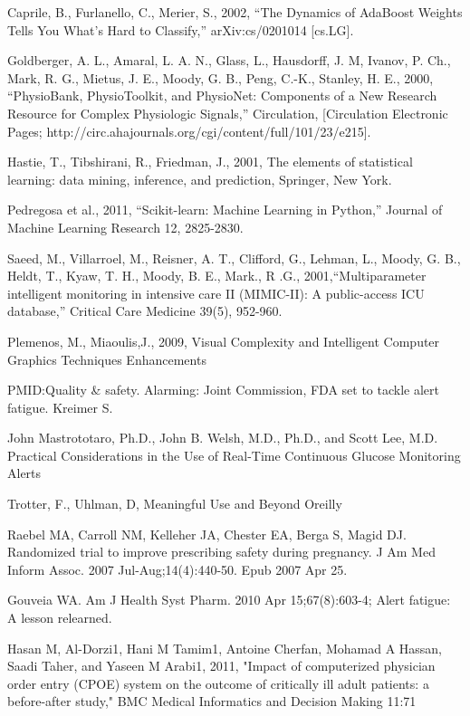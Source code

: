 \documentclass[12pt]{article}
\begin{document}
\begin{thebibliography}{1}

Caprile, B., Furlanello, C., Merier, S., 2002, ``The Dynamics of AdaBoost Weights Tells You What's Hard to Classify,'' arXiv:cs/0201014 [cs.LG].

Goldberger, A. L., Amaral, L. A. N., Glass, L., Hausdorff, J. M, Ivanov, P. Ch., Mark, R. G., Mietus, J. E., Moody, G. B., Peng, C.-K., Stanley, H. E., 2000, ``PhysioBank, PhysioToolkit, and PhysioNet: Components of a New Research Resource for Complex Physiologic Signals,'' Circulation, [Circulation Electronic Pages; http://circ.ahajournals.org/cgi/content/full/101/23/e215].

Hastie, T., Tibshirani, R., Friedman, J., 2001, The elements of statistical learning: data mining, inference, and prediction, Springer, New York.

Pedregosa et al., 2011, ``Scikit-learn: Machine Learning in Python,'' Journal of Machine Learning Research 12, 2825-2830.

Saeed, M., Villarroel, M., Reisner, A. T., Clifford, G., Lehman, L., Moody, G. B., Heldt, T., Kyaw, T. H., Moody, B. E., Mark., R .G., 2001,``Multiparameter intelligent monitoring in intensive care II (MIMIC-II): A public-access ICU database,'' Critical Care Medicine 39(5), 952-960.


Plemenos, M., Miaoulis,J., 2009, Visual Complexity and Intelligent Computer Graphics Techniques Enhancements


PMID:Quality \& safety. Alarming: Joint Commission, FDA set to tackle alert fatigue. Kreimer S.

John Mastrototaro, Ph.D., John B. Welsh, M.D., Ph.D., and Scott Lee, M.D.
Practical Considerations in the Use of Real-Time Continuous Glucose Monitoring Alerts

Trotter, F., Uhlman, D, Meaningful Use and Beyond Oreilly

Raebel MA, Carroll NM, Kelleher JA, Chester EA, Berga S, Magid DJ.
Randomized trial to improve prescribing safety during pregnancy.
J Am Med Inform Assoc. 2007 Jul-Aug;14(4):440-50. Epub 2007 Apr 25.

Gouveia WA. Am J Health Syst Pharm. 2010 Apr 15;67(8):603-4; Alert fatigue: A lesson relearned.

Hasan M, Al-Dorzi1, Hani M Tamim1, Antoine Cherfan, Mohamad A Hassan, Saadi Taher, and Yaseen M Arabi1, 2011, "Impact of computerized physician order entry (CPOE) system on the outcome of critically ill adult patients: a before-after study," BMC Medical Informatics and Decision Making 11:71 


\end{thebibliography}
\end{document}
